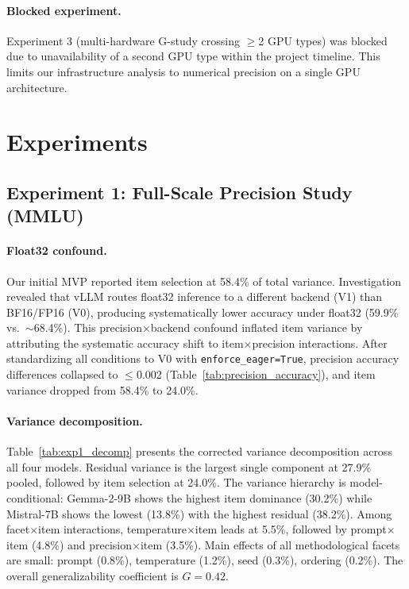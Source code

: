 \documentclass[letterpaper]{article}
\begin{document}
\paragraph{Blocked experiment.}
Experiment 3 (multi-hardware G-study crossing $\geq$2 GPU types) was blocked due to unavailability of a second GPU type within the project timeline.
This limits our infrastructure analysis to numerical precision on a single GPU architecture.


\section{Experiments}

\subsection{Experiment 1: Full-Scale Precision Study (MMLU)}
\label{sec:confound}

\paragraph{Float32 confound.}
Our initial MVP reported item selection at 58.4\% of total variance.
Investigation revealed that vLLM routes float32 inference to a different backend (V1) than BF16/FP16 (V0), producing systematically lower accuracy under float32 (59.9\% vs.\ $\sim$68.4\%).
This precision$\times$backend confound inflated item variance by attributing the systematic accuracy shift to item$\times$precision interactions.
After standardizing all conditions to V0 with \texttt{enforce\_eager=True}, precision accuracy differences collapsed to $\leq$0.002 (Table~\ref{tab:precision_accuracy}), and item variance dropped from 58.4\% to 24.0\%.

\paragraph{Variance decomposition.}
Table~\ref{tab:exp1_decomp} presents the corrected variance decomposition across all four models.
Residual variance is the largest single component at 27.9\% pooled, followed by item selection at 24.0\%.
The variance hierarchy is model-conditional: Gemma-2-9B shows the highest item dominance (30.2\%) while Mistral-7B shows the lowest (13.8\%) with the highest residual (38.2\%).
Among facet$\times$item interactions, temperature$\times$item leads at 5.5\%, followed by prompt$\times$item (4.8\%) and precision$\times$item (3.5\%).
Main effects of all methodological facets are small: prompt (0.8\%), temperature (1.2\%), seed (0.3\%), ordering (0.2\%).
The overall generalizability coefficient is $G=0.42$.
\end{document}
